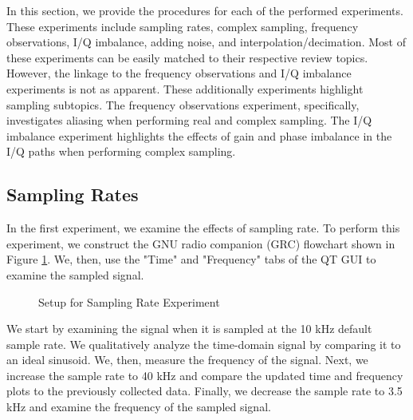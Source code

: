 \documentclass{article}
\begin{document}
In this section, we provide the procedures for each of the performed experiments. These experiments include sampling rates, complex sampling, frequency observations, I/Q imbalance, adding noise, and interpolation/decimation. Most of these experiments can be easily matched to their respective review topics. However, the linkage to the frequency observations and I/Q imbalance experiments is not as apparent. These additionally experiments highlight sampling subtopics. The frequency observations experiment, specifically, investigates aliasing when performing real and complex sampling. The I/Q imbalance experiment highlights the effects of gain and phase imbalance in the I/Q paths when performing complex sampling.

\subsection{Sampling Rates \label{subsection::sampling_rates}}

In the first experiment, we examine the effects of sampling rate. To perform this experiment, we construct the GNU radio companion (GRC) flowchart shown in Figure \ref{fig::sampling_rates_experiment}. We, then, use the "Time" and "Frequency" tabs of the QT GUI to examine the sampled signal.

\begin{figure}[H]
	\centerline{}
	\caption{Setup for Sampling Rate Experiment}
	\label{fig::sampling_rates_experiment}
\end{figure}

We start by examining the signal when it is sampled at the 10 kHz default sample rate. We qualitatively analyze the time-domain signal by comparing it to an ideal sinusoid. We, then, measure the frequency of the signal. Next, we increase the sample rate to 40 kHz and compare the updated time and frequency plots to the previously collected data. Finally, we decrease the sample rate to 3.5 kHz and examine the frequency of the sampled signal.
\end{document}
